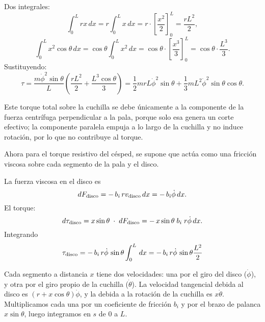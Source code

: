\documentclass[stu,12pt,floatsintext,draftfirst,spanish]{report}
\begin{document}
	Dos integrales:
	\begin{equation}
	\int_0^L rx \,dx = r \int_0^L x \,dx = r \cdot \left[ \frac{x^2}{2} \right]_0^L = \frac{rL^2}{2},
	\end{equation}
	\begin{equation}
	\int_0^L x^2\cos\theta\,dx = \cos\theta \int_0^L x^2 \,dx = \cos\theta \cdot \left[ \frac{x^3}{3} \right]_0^L = \cos\theta \cdot \frac{L^3}{3}.
	\end{equation}
	Sustituyendo:
	\begin{equation}
	\tau = \frac{m\dot\phi^2\sin\theta}{L} \left( \frac{rL^2}{2} + \frac{L^3\cos\theta}{3} \right) = \frac{1}{2}m r L \dot\phi^2 \sin\theta + \frac{1}{3}m L^2 \dot\phi^2 \sin\theta \cos\theta.
	\end{equation}
	
	Este torque total sobre la cuchilla se debe únicamente a la componente de la fuerza centrífuga perpendicular a la pala, porque solo esa genera un corte efectivo; la componente paralela empuja a lo largo de la cuchilla y no induce rotación, por lo que no contribuye al torque.
	
	Ahora para el torque resistivo del césped, se supone que actúa como una fricción viscosa sobre cada segmento de la pala y el disco.
	
	La fuerza viscosa en el disco es
	\begin{equation}
	dF_{\rm disco} = -\,b_i\,rv_{\rm disco}\,dx
	= -\,b_i\dot\phi\,dx.
	\end{equation}
	El torque:  
	\begin{equation}
	d\tau_{\rm disco}
	= x\sin\theta \;\cdot\; dF_{\rm disco}
	= -\,x\sin\theta\;b_i\;r\dot\phi\,dx.
	\end{equation}
	Integrando 
	\begin{equation}
	\tau_{\rm disco}
	= -\,b_i\,r\dot\phi\,\sin\theta
	\int_0^L\,dx
	= -\,b_i\,r\dot\phi\,\sin\theta\frac{L^2}{2}
	\end{equation}
	
	 Cada segmento a distancia $x$ tiene dos velocidades: una por el giro del disco ($\dot\phi$), y otra por el giro propio de la cuchilla ($\dot\theta$). La velocidad tangencial debida al disco es $(r + x\cos\theta)\dot\phi$, y la debida a la rotación de la cuchilla es $x\dot\theta$. Multiplicamos cada una por un coeficiente de fricción $b_i$ y por el brazo de palanca $x\sin\theta$, luego integramos en $s$ de $0$ a $L$.
	 
\end{document}
